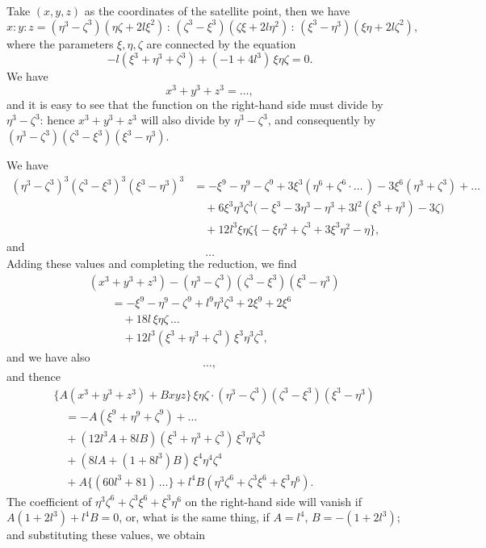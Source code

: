 \documentclass[11pt]{article}
\begin{document}
Take $(x, y, z)$ as the coordinates of the satellite point, then we have
\[
x : y : z = (\eta^3 - \zeta^3)(\eta\zeta + 2 l \xi^2) \,:\, (\zeta^3 - \xi^3)(\zeta\xi + 2 l\eta^2) \,:\, (\xi^3 - \eta^3)(\xi\eta + 2 l\zeta^2),
\]
where the parameters $\xi, \eta, \zeta$ are connected by the equation
\[
-l(\xi^3 + \eta^3 + \zeta^3) + (-1 + 4 l^3)\,\xi\eta\zeta = 0.
\]
We have
\[
x^3 + y^3 + z^3 = \ldots,
\]
and it is easy to see that the function on the right-hand side must divide by $\eta^3 - \zeta^3$: hence $x^3 + y^3 + z^3$ will also divide by $\eta^3 - \zeta^3$, and consequently by $(\eta^3 - \zeta^3)(\zeta^3 - \xi^3)(\xi^3 - \eta^3)$.

We have
\begin{align*}
(\eta^3 - \zeta^3)^3 (\zeta^3 - \xi^3)^3 (\xi^3 - \eta^3)^3 &= -\xi^9 - \eta^9 - \zeta^9 + 3\xi^3 (\eta^6 + \zeta^6 \cdot\ldots\,) - 3\xi^6 (\eta^3 + \zeta^3) + \ldots \\
&\quad + 6\xi^3 \eta^3 \zeta^3 \bigl(-\xi^3 - 3\eta^3 - \eta^3 + 3 l^2 (\xi^3 + \eta^3) - 3\zeta\bigr) \\
&\quad + 12 l^3 \xi\eta\zeta\bigl\{-\xi\eta^2 + \zeta^3 + 3\xi^3 \eta^2 - \eta\bigr\},
\end{align*}
and
\[
\ldots
\]
Adding these values and completing the reduction, we find
\begin{align*}
&(x^3 + y^3 + z^3) - (\eta^3 - \zeta^3)(\zeta^3 - \xi^3)(\xi^3 - \eta^3) \\
&\qquad = -\xi^9 - \eta^9 - \zeta^9 + l^9 \eta^3 \zeta^3 + 2\xi^9 + 2\xi^6 \\
&\qquad\quad + 18 l\,\xi\eta\zeta\,\ldots \\
&\qquad\quad + 12 l^3 (\xi^3 + \eta^3 + \zeta^3)\,\xi^3 \eta^3 \zeta^3,
\end{align*}
and we have also
\[
\ldots,
\]
and thence
\begin{align*}
&\bigl\{A(x^3 + y^3 + z^3) + B x y z\bigr\}\,\xi\eta\zeta \cdot (\eta^3 - \zeta^3)(\zeta^3 - \xi^3)(\xi^3 - \eta^3) \\
&\quad = -A(\xi^9 + \eta^9 + \zeta^9) + \ldots \\
&\quad + (12 l^3 A + 8 l B)(\xi^3 + \eta^3 + \zeta^3)\,\xi^3 \eta^3 \zeta^3 \\
&\quad + (8 l A + (1 + 8 l^3) B)\,\xi^4 \eta^4 \zeta^4 \\
&\quad + A\bigl\{(60 l^3 + 81)\,\ldots\bigr\} + l^4 B(\eta^3 \zeta^6 + \zeta^3 \xi^6 + \xi^3 \eta^6).
\end{align*}
The coefficient of $\eta^3 \zeta^6 + \zeta^3 \xi^6 + \xi^3 \eta^6$ on the right-hand side will vanish if $A(1 + 2 l^3) + l^4 B = 0$, or, what is the same thing, if $A = l^4$, $B = -(1 + 2 l^3)$; and substituting these values, we obtain
\end{document}
